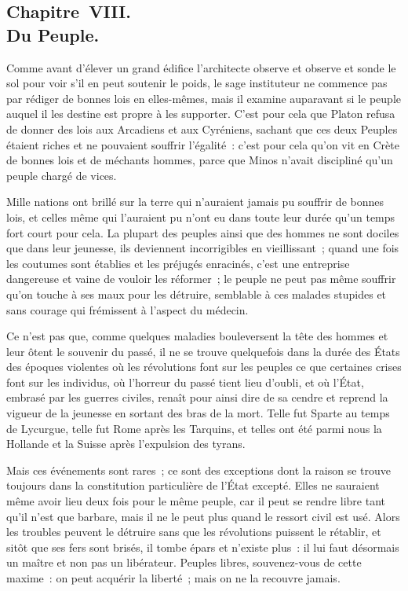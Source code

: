 \documentclass[french,twoside]{book} %
\begin{document}
\subsection[{Chapitre VIII. Du Peuple.}]{Chapitre VIII. \\
Du Peuple.}
\noindent Comme avant d’élever un grand édifice l’architecte observe et observe et sonde le sol pour voir s’il en peut soutenir le poids, le sage instituteur ne commence pas par rédiger de bonnes lois en elles-mêmes, mais il examine auparavant si le peuple auquel il les destine est propre à les supporter. C’est pour cela que Platon refusa de donner des lois aux Arcadiens et aux Cyréniens, sachant que ces deux Peuples étaient riches et ne pouvaient souffrir l’égalité : c’est pour cela qu’on vit en Crète de bonnes lois et de méchants hommes, parce que Minos n’avait discipliné qu’un peuple chargé de vices.\par
Mille nations ont brillé sur la terre qui n’auraient jamais pu souffrir de bonnes lois, et celles même qui l’auraient pu n’ont eu dans toute leur durée qu’un temps fort court pour cela. La plupart des peuples ainsi que des hommes ne sont dociles que dans leur jeunesse, ils deviennent incorrigibles en vieillissant ; quand une fois les coutumes sont établies et les préjugés enracinés, c’est une entreprise dangereuse et vaine de vouloir les réformer ; le peuple ne peut pas même souffrir qu’on touche à ses maux pour les détruire, semblable à ces malades stupides et sans courage qui frémissent à l’aspect du médecin.\par
Ce n’est pas que, comme quelques maladies bouleversent la tête des hommes et leur ôtent le souvenir du passé, il ne se trouve quelquefois dans la durée des États des époques violentes où les révolutions font sur les peuples ce que certaines crises font sur les individus, où l’horreur du passé tient lieu d’oubli, et où l’État, embrasé par les guerres civiles, renaît pour ainsi dire de sa cendre et reprend la vigueur de la jeunesse en sortant des bras de la mort. Telle fut Sparte au temps de Lycurgue, telle fut Rome après les Tarquins, et telles ont été parmi nous la Hollande et la Suisse après l’expulsion des tyrans.\par
Mais ces événements sont rares ; ce sont des exceptions dont la raison se trouve toujours dans la constitution particulière de l’État excepté. Elles ne sauraient même avoir lieu deux fois pour le même peuple, car il peut se rendre libre tant qu’il n’est que barbare, mais il ne le peut plus quand le ressort civil est usé. Alors les troubles peuvent le détruire sans que les révolutions puissent le rétablir, et sitôt que ses fers sont brisés, il tombe épars et n’existe plus : il lui faut désormais un maître et non pas un libérateur. Peuples libres, souvenez-vous de cette maxime : on peut acquérir la liberté ; mais on ne la recouvre jamais.\par
\end{document}
